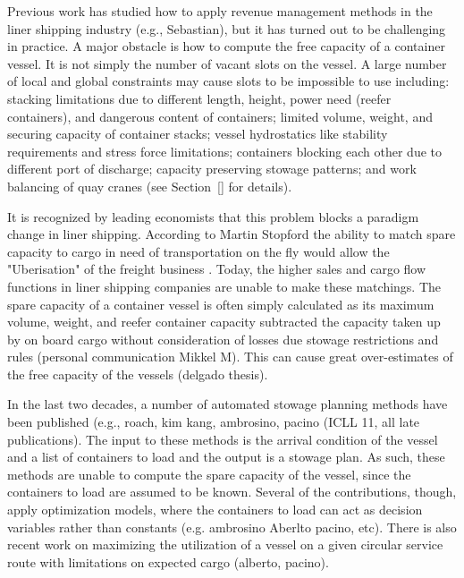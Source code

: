 \documentclass[runningheads]{llncs}
\begin{document}
Previous work has studied how to apply revenue management methods in the liner shipping industry (e.g., Sebastian), but it has turned out to be challenging in practice. A major obstacle is how to compute the free capacity of a container vessel. It is not simply the number of vacant slots on the vessel. A large number of local and global constraints may cause slots to be impossible to use including: stacking limitations due to different length, height, power need (reefer containers), and dangerous content of containers; limited volume, weight, and securing capacity of container stacks; vessel hydrostatics like stability requirements and stress force limitations; containers blocking each other due to different port of discharge; capacity preserving stowage patterns; and work balancing of quay cranes (see Section~\ref{} for details).

It is recognized by leading economists that this problem blocks a paradigm change in liner shipping. According to Martin Stopford the ability to match spare capacity to cargo in need of transportation on the fly would allow the "Uberisation" of the freight business \cite{EApril18}. Today, the higher sales and cargo flow functions in liner shipping companies are unable to make these matchings. The spare capacity of a container vessel is often simply calculated as its maximum volume, weight, and reefer container capacity subtracted the capacity taken up by on board cargo without consideration of losses due stowage restrictions and rules (personal communication Mikkel M). This can cause great over-estimates of the free capacity of the vessels (delgado thesis).

In the last two decades, a number of automated stowage planning methods have been published (e.g., roach, kim kang, ambrosino, pacino (ICLL 11, all late publications). The input to these methods is the arrival condition of the vessel and a list of containers to load and the output is a stowage plan. As such, these methods are unable to compute the spare capacity of the vessel, since the containers to load are assumed to be known. Several of the contributions, though, apply optimization models, where the containers to load can act as decision variables rather than constants (e.g. ambrosino Aberlto pacino, etc). There is also recent work on maximizing the utilization of a vessel on a given circular service route with limitations on expected cargo (alberto, pacino). 
\end{document}
